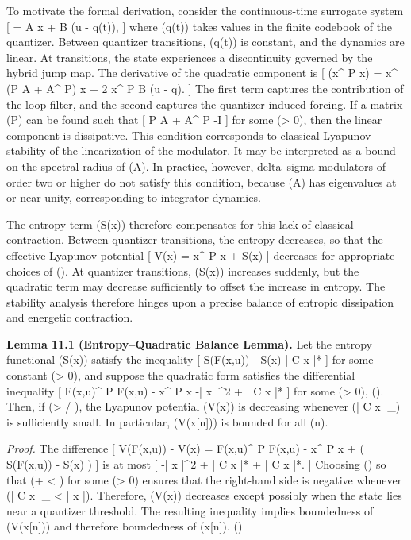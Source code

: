 To motivate the formal derivation, consider the continuous-time surrogate system
[
 = A x + B (u - q(t)),
]
where (q(t)) takes values in the finite codebook of the quantizer. Between quantizer transitions, (q(t)) is constant, and the dynamics are linear. At transitions, the state experiences a discontinuity governed by the hybrid jump map. The derivative of the quadratic component is
[
 (x^{\top} P x) = x^{\top} (P A + A^{\top} P) x + 2 x^{\top} P B (u - q).
]
The first term captures the contribution of the loop filter, and the second captures the quantizer-induced forcing. If a matrix (P) can be found such that
[
P A + A^{\top} P \preceq -\gamma I
]
for some (\gamma > 0), then the linear component is dissipative. This condition corresponds to classical Lyapunov stability of the linearization of the modulator. It may be interpreted as a bound on the spectral radius of (A). In practice, however, delta–sigma modulators of order two or higher do not satisfy this condition, because (A) has eigenvalues at or near unity, corresponding to integrator dynamics.

The entropy term (S(x)) therefore compensates for this lack of classical contraction. Between quantizer transitions, the entropy decreases, so that the effective Lyapunov potential
[
V(x) = x^{\top} P x + \alpha S(x)
]
decreases for appropriate choices of (\alpha). At quantizer transitions, (S(x)) increases suddenly, but the quadratic term may decrease sufficiently to offset the increase in entropy. The stability analysis therefore hinges upon a precise balance of entropic dissipation and energetic contraction.

\medskip

\textbf{Lemma 11.1 (Entropy–Quadratic Balance Lemma).}
Let the entropy functional (S(x)) satisfy the inequality
[
S(F(x,u)) - S(x) \leq \beta | C x |*{\infty}
]
for some constant (\beta > 0), and suppose the quadratic form satisfies the differential inequality
[
F(x,u)^{\top} P F(x,u) - x^{\top} P x \leq -\gamma | x |^{2} + \delta | C x |*{\infty}
]
for some (\gamma > 0), (\delta {}). Then, if (\alpha > \delta / \gamma), the Lyapunov potential (V(x)) is decreasing whenever (| C x |_{\infty}) is sufficiently small. In particular, (V(x[n])) is bounded for all (n).

\textit{Proof.}
The difference
[
V(F(x,u)) - V(x) = F(x,u)^{\top} P F(x,u) - x^{\top} P x + \alpha ( S(F(x,u)) - S(x) )
]
is at most
[
-\gamma | x |^{2} + \delta | C x |*{\infty} + \alpha \beta | C x |*{\infty}.
]
Choosing (\alpha) so that (\alpha \beta + \delta < \gamma \epsilon) for some (\epsilon > 0) ensures that the right-hand side is negative whenever (| C x |_{\infty} < \epsilon | x |). Therefore, (V(x)) decreases except possibly when the state lies near a quantizer threshold. The resulting inequality implies boundedness of (V(x[n])) and therefore boundedness of (x[n]). \hfill(\square)

